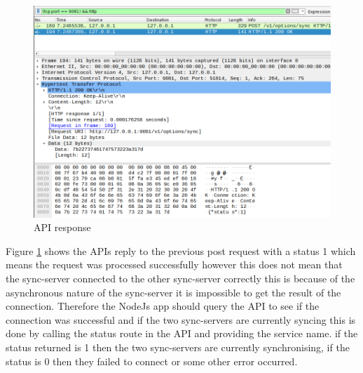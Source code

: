 \begin{figure}[!h]
  \centering
      \includegraphics[width=1\textwidth]{Figures/b10.png}
  \caption[API response]{API response}
  \label{fig:b10}
\end{figure}
\FloatBarrier
Figure \ref{fig:b10} shows the APIs reply to the previous post request with a status 1 which means the request was processed successfully however this does not mean that the sync-server connected to the other sync-server correctly this is because of the asynchronous nature of the sync-server it is impossible to get the result of the connection. Therefore the NodeJs app should query the API to see if the connection was successful and if the two sync-servers are currently syncing this is done by calling the status route in the API and providing the service name. if the status returned is 1 then the two sync-servers are currently synchronising, if the status is 0 then they failed to connect or some other error occurred.

